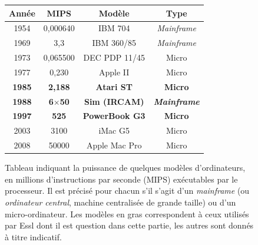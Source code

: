\documentclass[a4paper,12pt]{article}
\begin{document}
\begin{figure}[!h]
\begin{center}
\begin{tabular}{|c|c|c|c|}
\hline
\textbf{Année} & \textbf{MIPS} & \textbf{Modèle} & \textbf{Type} \\
\hline
1954 & 0,000640 & IBM 704 & \emph{Mainframe} \\
\hline
1969 & 3,3 & IBM 360/85 & \emph{Mainframe} \\
\hline
1973 & 0,065500 & DEC PDP 11/45 & Micro \\
\hline
1977 & 0,230 & Apple II & Micro \\
\hline
\textbf{1985} & \textbf{2,188} & \textbf{Atari ST} & \textbf{Micro} \\
\hline
\textbf{1988} & \textbf{6$\times$50} & \textbf{Sim (IRCAM)} & \textbf{\emph{Mainframe}} \\
\hline
\textbf{1997} & \textbf{525} & \textbf{PowerBook G3} & \textbf{Micro} \\
\hline
2003 & 3100 & iMac G5 & Micro \\
\hline
2008 & 50000 & Apple Mac Pro & Micro \\
\hline
\end{tabular}
\caption{\footnotesize Tableau indiquant la puissance de quelques modèles d'ordinateurs, en millions d'instructions par seconde (MIPS) exécutables par le processeur. Il est précisé pour chacun s'il s'agit d'un \emph{mainframe} (ou \emph{ordinateur central}, machine centralisée de grande taille) ou d'un micro-ordinateur. Les modèles en gras correspondent à ceux utilisés par Essl dont il est question dans cette partie, les autres sont donnés à titre indicatif.}
\label{tableaumips}
\end{center}
\end{figure}
\end{document}
